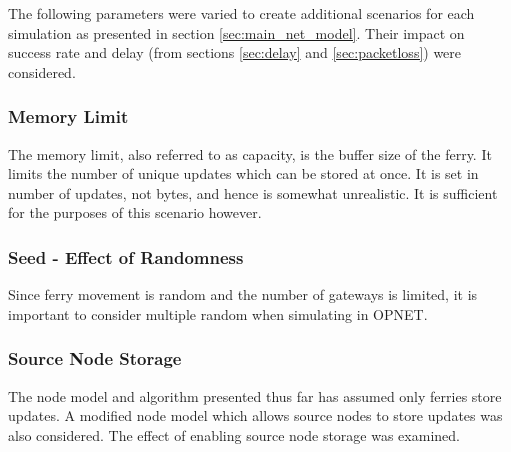 The following parameters were varied to create additional scenarios for each simulation as presented in section \ref{sec:main_net_model}. 
Their impact on success rate and delay (from sections \ref{sec:delay} and \ref{sec:packetloss}) were considered.
  
\subsubsection{Memory Limit}
\label{sec:mainMemLimit}
The memory limit, also referred to as capacity, is the buffer size of the ferry.
It limits the number of unique updates which can be stored at once.
It is set in number of updates, not bytes, and hence is somewhat unrealistic.
It is sufficient for the purposes of this scenario however.

\subsubsection{Seed - Effect of Randomness}
Since ferry movement is random and the number of gateways is limited, it is important to consider multiple random when simulating in OPNET. 


\subsubsection{Source Node Storage}
\label{sec:source_node_storage}
The node model and algorithm presented thus far has assumed only ferries store updates. 
A modified node model which allows source nodes to store updates was also considered.
The effect of enabling source node storage was examined.

